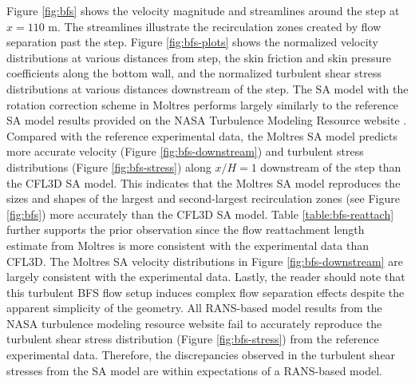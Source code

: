 Figure \ref{fig:bfs} shows the velocity magnitude and streamlines around the step at $x=110$ m. The
streamlines illustrate the recirculation zones created by flow separation past the step.
Figure \ref{fig:bfs-plots} shows the normalized velocity distributions at various distances from
step, the skin friction and skin pressure coefficients along the bottom wall, and the normalized
turbulent shear stress distributions at various distances downstream of the step. The \gls{SA}
model with the rotation correction scheme in Moltres performs largely similarly to the reference
\gls{SA} model results provided on the \gls{NASA} Turbulence Modeling Resource website
\cite{rumsey_turbulence_nodate}. Compared with the reference experimental data, the Moltres
\gls{SA} model predicts more accurate velocity (Figure \ref{fig:bfs-downstream}) and turbulent
stress distributions (Figure \ref{fig:bfs-stress}) along $x/H=1$ downstream of the
step than the CFL3D \gls{SA} model. This indicates that the Moltres
\gls{SA} model reproduces the sizes and shapes of the largest and second-largest recirculation
zones (see Figure \ref{fig:bfs}) more accurately than the CFL3D \gls{SA} model. Table
\ref{table:bfs-reattach} further supports the prior observation since the flow reattachment length
estimate from Moltres is more consistent with the experimental data than CFL3D. The Moltres
\gls{SA} velocity distributions in Figure \ref{fig:bfs-downstream} are largely consistent with the
experimental data. Lastly, the reader should
note that this turbulent \gls{BFS} flow setup induces complex flow separation effects despite the
apparent simplicity of the geometry. All \gls{RANS}-based model results from the \gls{NASA}
turbulence modeling resource website \cite{rumsey_turbulence_nodate} fail to accurately reproduce
the turbulent shear stress distribution (Figure \ref{fig:bfs-stress}) from the reference
experimental data. Therefore, the discrepancies observed in the turbulent shear stresses from the
\gls{SA} model are within expectations of a \gls{RANS}-based model.

